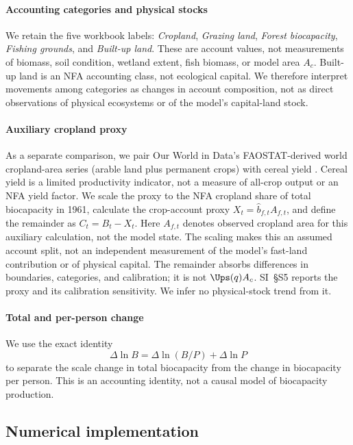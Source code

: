 \paragraph{Accounting categories and physical stocks} We retain the five workbook labels: \emph{Cropland}, \emph{Grazing land}, \emph{Forest biocapacity}, \emph{Fishing grounds}, and \emph{Built-up land}. These are account values, not measurements of biomass, soil condition, wetland extent, fish biomass, or model area $A_c$. Built-up land is an NFA accounting class, not ecological capital. We therefore interpret movements among categories as changes in account composition, not as direct observations of physical ecosystems or of the model's capital-land stock.

\paragraph{Auxiliary cropland proxy} As a separate comparison, we pair Our World in Data's FAOSTAT-derived world cropland-area series (arable land plus permanent crops) with cereal yield \citep{OWIDCropland2026,OWIDCereal2026}. Cereal yield is a limited productivity indicator, not a measure of all-crop output or an NFA yield factor. We scale the proxy to the NFA cropland share of total biocapacity in 1961, calculate the crop-account proxy $X_t=\hat b_{f,t}A_{f,t}$, and define the remainder as $C_t=B_t-X_t$. Here $A_{f,t}$ denotes observed cropland area for this auxiliary calculation, not the model state. The scaling makes this an assumed account split, not an independent measurement of the model's fast-land contribution or of physical capital. The remainder absorbs differences in boundaries, categories, and calibration; it is not $\Ups(q)A_c$. SI~\S S5 reports the proxy and its calibration sensitivity. We infer no physical-stock trend from it.

\paragraph{Total and per-person change} We use the exact identity
\begin{equation*}
\Delta\ln B=\Delta\ln(B/P)+\Delta\ln P
\end{equation*}
to separate the scale change in total biocapacity from the change in biocapacity per person. This is an accounting identity, not a causal model of biocapacity production.

\subsection{Numerical implementation}\label{sec:numerics}

